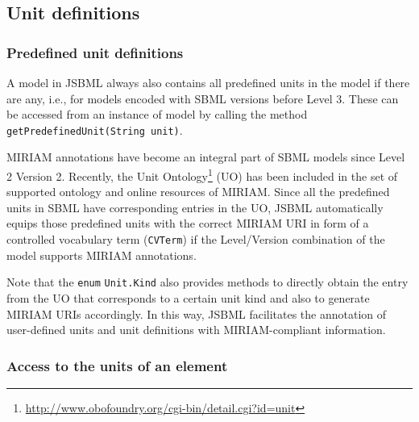 \documentclass[
  BCOR12mm,
  letterpaper,
  11pt,
  headsepline,
  pointlessnumbers,
  tablecaptionabove,
  onelinecaption,
  headinclude,
  appendixprefix,
  idxtotoc,
  bibtotoc,
  twoside,
  titlepage
]{scrartcl}
\begin{document}
\subsection{Unit definitions}

\subsubsection{Predefined unit definitions}

A model in JSBML
always also contains all predefined units in the model
if there are any, i.e., for models encoded with SBML versions before Level
3. These can be accessed from an instance of model by calling the method
\texttt{getPredefinedUnit(String unit)}.

MIRIAM annotations \citep{Novere2005} have become an integral part of SBML models
since Level 2 Version 2. Recently, the Unit
Ontology\footnote{\url{http://www.obofoundry.org/cgi-bin/detail.cgi?id=unit}}
(UO) has been included in the set of supported ontology and online resources of
MIRIAM. Since all the predefined units in SBML have corresponding entries in the
UO, JSBML
automatically equips those predefined units with the correct MIRIAM
URI in form of a controlled vocabulary term (\texttt{CVTerm}) if the
Level/Version combination of the model supports MIRIAM annotations.

Note that the \texttt{enum} \texttt{Unit.Kind}
also provides methods to directly obtain the entry from the UO that corresponds
to a certain unit kind and also to generate MIRIAM URIs accordingly. In this
way, JSBML facilitates the annotation of user-defined units and unit definitions
with MIRIAM-compliant information.

\subsubsection{Access to the units of an element}
\end{document}
